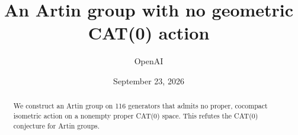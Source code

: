 \documentclass[11pt]{article}
\title{An Artin group with no geometric CAT(0) action}
\author{OpenAI}
\date{September 23, 2026}
\begin{document}
\maketitle
\begin{abstract}
We construct an Artin group on 116 generators that admits no proper,
cocompact isometric action on a nonempty proper CAT(0) space.
This refutes the CAT(0) conjecture for Artin groups.
\end{abstract}
\tableofcontents








\end{document}
